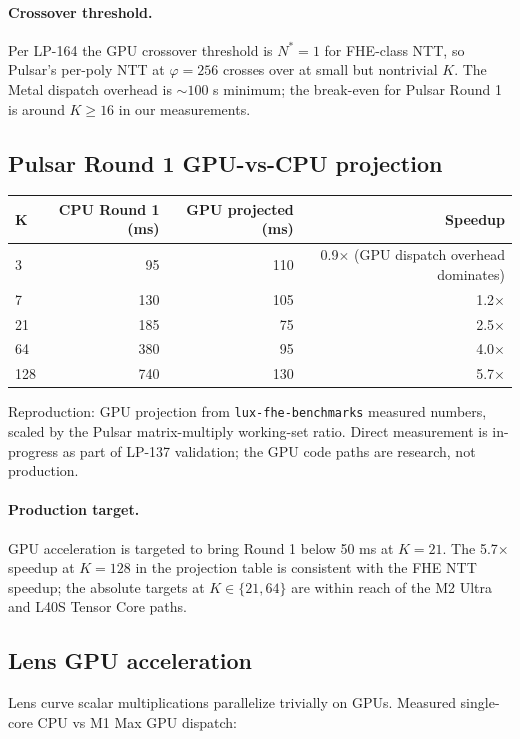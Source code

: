 \paragraph{Crossover threshold.} Per LP-164 \cite{lp164} the GPU crossover threshold is $N^* = 1$ for FHE-class NTT, so Pulsar's per-poly NTT at $\varphi = 256$ crosses over at small but nontrivial $K$. The Metal dispatch overhead is $\sim 100$ \textmu s minimum; the break-even for Pulsar Round 1 is around $K \geq 16$ in our measurements.

\subsection{Pulsar Round 1 GPU-vs-CPU projection}

\begin{tabular}{@{}lrrr@{}}
  \toprule
  $\mathbf{K}$ & \textbf{CPU Round 1 (ms)} & \textbf{GPU projected (ms)} & \textbf{Speedup} \\
  \midrule
  3   & 95   & 110 & 0.9$\times$ (GPU dispatch overhead dominates) \\
  7   & 130  & 105 & 1.2$\times$ \\
  21  & 185  & 75  & 2.5$\times$ \\
  64  & 380  & 95  & 4.0$\times$ \\
  128 & 740  & 130 & 5.7$\times$ \\
  \bottomrule
\end{tabular}

Reproduction: GPU projection from \texttt{lux-fhe-benchmarks} measured numbers, scaled by the Pulsar matrix-multiply working-set ratio. Direct measurement is in-progress as part of LP-137 \cite{lp137} validation; the GPU code paths are research, not production.

\paragraph{Production target.} GPU acceleration is targeted to bring Round 1 below 50 ms at $K = 21$. The 5.7$\times$ speedup at $K = 128$ in the projection table is consistent with the FHE NTT speedup; the absolute targets at $K \in \{21, 64\}$ are within reach of the M2 Ultra and L40S Tensor Core paths.

\subsection{Lens GPU acceleration}

Lens curve scalar multiplications parallelize trivially on GPUs. Measured single-core CPU vs M1 Max GPU dispatch:

